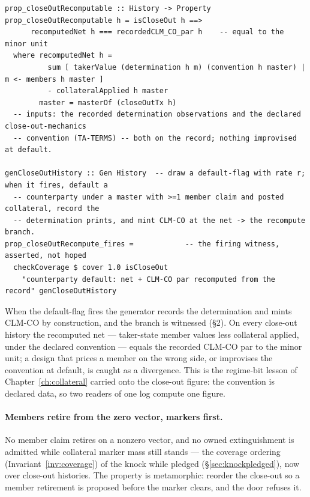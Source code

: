 \documentclass[11pt,a4paper]{article}
\begin{document}
\begin{lstlisting}
prop_closeOutRecomputable :: History -> Property
prop_closeOutRecomputable h = isCloseOut h ==>
      recomputedNet h === recordedCLM_CO_par h    -- equal to the minor unit
  where recomputedNet h =
          sum [ takerValue (determination h m) (convention h master) | m <- members h master ]
          - collateralApplied h master
        master = masterOf (closeOutTx h)
  -- inputs: the recorded determination observations and the declared close-out-mechanics
  -- convention (TA-TERMS) -- both on the record; nothing improvised at default.

genCloseOutHistory :: Gen History  -- draw a default-flag with rate r; when it fires, default a
  -- counterparty under a master with >=1 member claim and posted collateral, record the
  -- determination prints, and mint CLM-CO at the net -> the recompute branch.
prop_closeOutRecompute_fires =            -- the firing witness, asserted, not hoped
  checkCoverage $ cover 1.0 isCloseOut
    "counterparty default: net + CLM-CO par recomputed from the record" genCloseOutHistory
\end{lstlisting}

When the default-flag fires the generator records the determination and mints CLM-CO by
construction, and the branch is witnessed (\S 2). On every close-out history the recomputed
net --- taker-state member values less collateral applied, under the declared convention ---
equals the recorded CLM-CO par to the minor unit; a design that prices a member on the wrong
side, or improvises the convention at default, is caught as a divergence. This is the
regime-bit lesson of Chapter~\ref{ch:collateral} carried onto the close-out figure: the
convention is declared data, so two readers of one log compute one figure.

\paragraph{Members retire from the zero vector, markers first.} No member claim retires on a
nonzero vector, and no owned extinguishment is admitted while collateral marker mass still
stands --- the coverage ordering (Invariant~\ref{inv:coverage}) of the knock while pledged
(\S\ref{sec:knockpledged}), now over close-out histories. The property is metamorphic:
reorder the close-out so a member retirement is proposed before the marker clears, and the
door refuses it.
\end{document}
